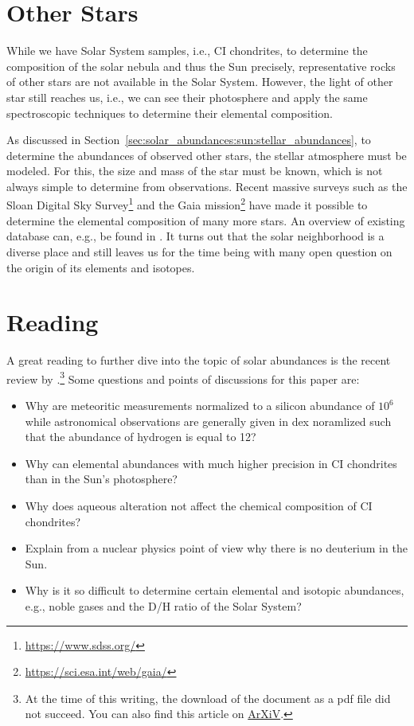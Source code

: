 \section{Other Stars}

While we have Solar System samples, i.e., CI chondrites, to determine the composition of the solar nebula and thus the Sun precisely, representative rocks of other stars are not available in the Solar System. However, the light of other star still reaches us, i.e., we can see their photosphere and apply the same spectroscopic techniques to determine their elemental composition. 

As discussed in Section~\ref{sec:solar_abundances:sun:stellar_abundances}, to determine the abundances of observed other stars, the stellar atmosphere must be modeled. For this, the size and mass of the star must be known, which is not always simple to determine from observations. Recent massive surveys such as the Sloan Digital Sky Survey\footnote{\url{https://www.sdss.org/}} and the Gaia mission\footnote{\url{https://sci.esa.int/web/gaia/}} have made it possible to determine the elemental composition of many more stars. An overview of existing database can, e.g., be found in \citet{allende-prieto16}. It turns out that the solar neighborhood is a diverse place \citep[see, e.g.,][]{bensby14} and still leaves us for the time being with many open question on the origin of its elements and isotopes.

\section{Reading}

A great reading to further dive into the topic of solar abundances is the recent review by \citet{lodders20}.\footnote{At the time of this writing, the download of the document as a \ac{pdf} file did not succeed. You can also find this article on \href{https://arxiv.org/abs/1912.00844}{ArXiV}.} Some questions and points of discussions for this paper are:
\begin{itemize}
    \item Why are meteoritic measurements normalized to a silicon abundance of $10^6$ while astronomical observations are generally given in \ac{dex} noramlized such that the abundance of hydrogen is equal to 12?
    \item Why can elemental abundances with much higher precision in CI chondrites than in the Sun's photosphere?
    \item Why does aqueous alteration not affect the chemical composition of CI chondrites?
    \item Explain from a nuclear physics point of view why there is no deuterium in the Sun.
    \item Why is it so difficult to determine certain elemental and isotopic abundances, e.g., noble gases and the D/H ratio of the Solar System?
\end{itemize}